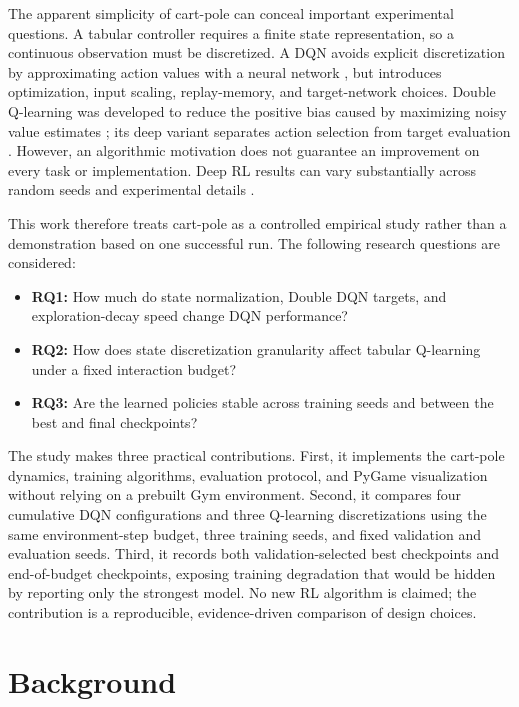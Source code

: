 \documentclass[conference]{IEEEtran}
\begin{document}
The apparent simplicity of cart-pole can conceal important experimental
questions. A tabular controller requires a finite state representation, so a
continuous observation must be discretized. A DQN avoids explicit
discretization by approximating action values with a neural network
\cite{mnih2015dqn}, but introduces optimization, input scaling, replay-memory,
and target-network choices. Double Q-learning was developed to reduce the
positive bias caused by maximizing noisy value estimates
\cite{hasselt2010double}; its deep variant separates action selection from
target evaluation \cite{vanhasselt2016double}. However, an algorithmic
motivation does not guarantee an improvement on every task or implementation.
Deep RL results can vary substantially across random seeds and experimental
details \cite{henderson2018matters}.

This work therefore treats cart-pole as a controlled empirical study rather
than a demonstration based on one successful run. The following research
questions are considered:

\begin{itemize}
    \item \textbf{RQ1:} How much do state normalization, Double DQN targets,
    and exploration-decay speed change DQN performance?
    \item \textbf{RQ2:} How does state discretization granularity affect
    tabular Q-learning under a fixed interaction budget?
    \item \textbf{RQ3:} Are the learned policies stable across training seeds
    and between the best and final checkpoints?
\end{itemize}

The study makes three practical contributions. First, it implements the
cart-pole dynamics, training algorithms, evaluation protocol, and PyGame
visualization without relying on a prebuilt Gym environment. Second, it
compares four cumulative DQN configurations and three Q-learning
discretizations using the same environment-step budget, three training seeds,
and fixed validation and evaluation seeds. Third, it records both
validation-selected best checkpoints and end-of-budget checkpoints, exposing
training degradation that would be hidden by reporting only the strongest
model. No new RL algorithm is claimed; the contribution is a reproducible,
evidence-driven comparison of design choices.

\section{Background}
\end{document}
